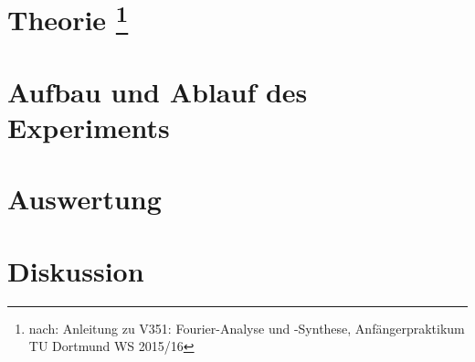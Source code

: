 \documentclass[a4,11pt]{article}
\begin{document}
	
	\tableofcontents
	\clearpage


	\section{Theorie
	\footnote{nach: Anleitung zu V351: Fourier-Analyse und -Synthese, Anfängerpraktikum TU Dortmund WS 2015/16}}
	
	\clearpage


	\section{Aufbau und Ablauf des Experiments}
	
	\clearpage
	
%	
%	


	\section{Auswertung}
	
	\clearpage


	\section{Diskussion}
	
	\label{sec:Diskussion}


	\todototoc
	\listoftodos
\end{document}
